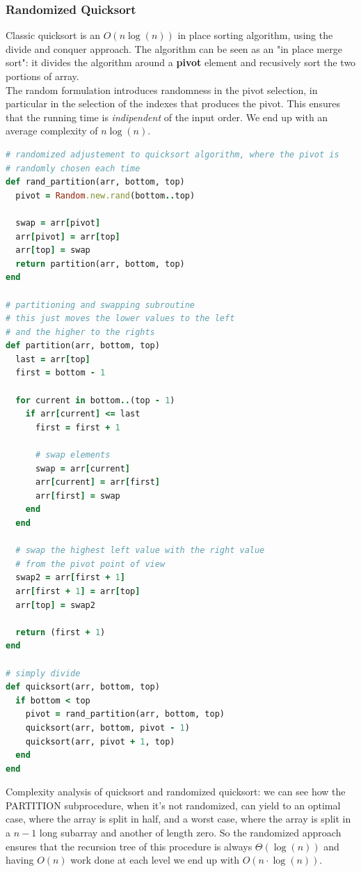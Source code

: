 \documentclass{article}
\begin{document}
			\subsubsection{Randomized Quicksort}
				Classic quicksort is an $O(n \log (n))$ in place sorting algorithm, using the divide and conquer approach. The algorithm can be seen as an "in place merge sort": it divides the algorithm around a \textbf{pivot} element and recusively sort the two portions of array.\\
				The random formulation introduces randomness in the pivot selection, in particular in the selection of the indexes that produces the pivot. This ensures that the running time is \textit{indipendent} of the input order. We end up with an average complexity of $n \log (n)$.
				\begin{lstlisting}[language=Ruby]
# randomized adjustement to quicksort algorithm, where the pivot is 
# randomly chosen each time
def rand_partition(arr, bottom, top)
  pivot = Random.new.rand(bottom..top)

  swap = arr[pivot]
  arr[pivot] = arr[top]
  arr[top] = swap
  return partition(arr, bottom, top)
end

# partitioning and swapping subroutine
# this just moves the lower values to the left 
# and the higher to the rights
def partition(arr, bottom, top)
  last = arr[top]
  first = bottom - 1

  for current in bottom..(top - 1)
    if arr[current] <= last
      first = first + 1

      # swap elements
      swap = arr[current]
      arr[current] = arr[first]
      arr[first] = swap
    end
  end

  # swap the highest left value with the right value
  # from the pivot point of view
  swap2 = arr[first + 1]
  arr[first + 1] = arr[top]
  arr[top] = swap2

  return (first + 1)
end

# simply divide
def quicksort(arr, bottom, top)
  if bottom < top
    pivot = rand_partition(arr, bottom, top)
    quicksort(arr, bottom, pivot - 1)
    quicksort(arr, pivot + 1, top)
  end
end              
				\end{lstlisting}
				Complexity analysis of quicksort and randomized quicksort: we can see how the PARTITION subprocedure, when it's not randomized, can yield to an optimal case, where the array is split in half, and a worst case, where the array is split in a $n-1$ long subarray and another of length zero. So the randomized approach ensures that the recursion tree of this procedure is always $\Theta(\log(n))$ and having $O(n)$ work done at each level we end up with $O(n \cdot \log(n))$.\\
\end{document}
